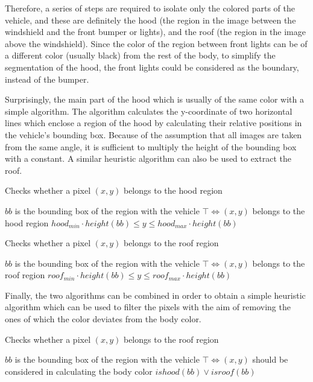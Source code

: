 \documentclass[times, utf8, zavrsni]{fer}
\begin{document}
Therefore, a series of steps are required to isolate only the colored parts of
the vehicle, and these are definitely the hood (the region in the image between
the windshield and the front bumper or lights), and the roof (the region in the
image above the windshield). Since the color of the region between front lights
can be of a different color (usually black) from the rest of the body, to
simplify the segmentation of the hood, the front lights could be considered as
the boundary, instead of the bumper.

Surprisingly, the main part of the hood which is usually of the same color with
a simple algorithm. The algorithm calculates the y-coordinate of two horizontal
lines which enclose a region of the hood by calculating their relative positions
in the vehicle's bounding box. Because of the assumption that all images are
taken from the same angle, it is sufficient to multiply the height of the
bounding box with a constant. A similar heuristic algorithm can also be used to
extract the roof.

\begin{algorithm} 
\caption{Checks whether a pixel $(x, y)$ belongs to the hood region}
\label{algo:is-hood}
\begin{algorithmic}
\REQUIRE $bb$ is the bounding box of the region with the vehicle
\ENSURE $\top \iff (x, y)$ belongs to the hood region
\RETURN $hood_{min} \cdot height(bb) \leq y \leq hood_{max} \cdot height(bb)$
\end{algorithmic}
\end{algorithm}

\begin{algorithm} 
\caption{Checks whether a pixel $(x, y)$ belongs to the roof region}
\label{algo:is-roof}
\begin{algorithmic}
\REQUIRE $bb$ is the bounding box of the region with the vehicle
\ENSURE $\top \iff (x, y)$ belongs to the roof region
\RETURN $roof_{min} \cdot height(bb) \leq y \leq roof_{max} \cdot height(bb)$
\end{algorithmic}
\end{algorithm}

Finally, the two algorithms can be combined in order to obtain a simple
heuristic algorithm which can be used to filter the pixels with the aim of
removing the ones of which the color deviates from the body color.

\begin{algorithm} 
\caption{Checks whether a pixel $(x, y)$ belongs to the roof region}
\label{algo:is-bodycolor}
\begin{algorithmic}
\REQUIRE $bb$ is the bounding box of the region with the vehicle
\ENSURE $\top \iff (x, y)$ should be considered in calculating the body color
\RETURN $ishood(bb) \lor isroof(bb)$
\end{algorithmic}
\end{algorithm}
\end{document}
